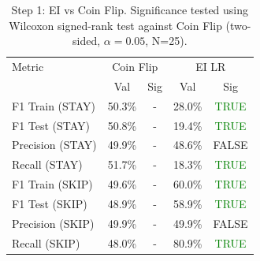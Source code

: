 \begin{table}[ht]
\centering
\begin{tabular}{lcccc}
\hline
Metric & \multicolumn{2}{c}{Coin Flip} & \multicolumn{2}{c}{EI LR} \\
 & Val & Sig & Val & Sig \\
\hline
F1 Train (STAY) & 50.3\% & - & 28.0\% & \textcolor{green}{TRUE} \\
F1 Test (STAY) & 50.8\% & - & 19.4\% & \textcolor{green}{TRUE} \\
Precision (STAY) & 49.9\% & - & 48.6\% & FALSE \\
Recall (STAY) & 51.7\% & - & 18.3\% & \textcolor{green}{TRUE} \\
F1 Train (SKIP) & 49.6\% & - & 60.0\% & \textcolor{green}{TRUE} \\
F1 Test (SKIP) & 48.9\% & - & 58.9\% & \textcolor{green}{TRUE} \\
Precision (SKIP) & 49.9\% & - & 49.9\% & FALSE \\
Recall (SKIP) & 48.0\% & - & 80.9\% & \textcolor{green}{TRUE} \\
\hline
\end{tabular}
\caption{Step 1: EI vs Coin Flip. Significance tested using Wilcoxon signed-rank test against Coin Flip (two-sided, $\alpha=0.05$, N=25).}
\label{tab:metrics_1_inter}
\end{table}